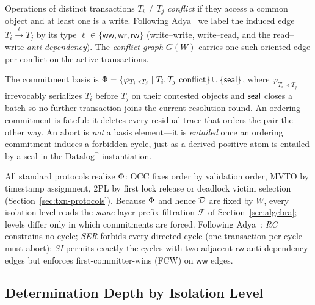 \begin{definition}
  \label{def:txn-conflict}
  Operations of distinct transactions $T_i \neq T_j$ \emph{conflict} if they
  access a common object and at least one is a write. Following
  Adya~\cite{adya1999weak} we label the induced edge
  $T_i \xrightarrow{\ell} T_j$ by its type
  $\ell \in \{\mathsf{ww}, \mathsf{wr}, \mathsf{rw}\}$ (write--write,
  write--read, and the read--write \emph{anti-dependency}). The \emph{conflict
  graph} $G(W)$ carries one such oriented edge per conflict on the active
  transactions.
\end{definition}

\begin{definition}
  \label{def:txn-basis}
  The commitment basis is
  $\Phi = \{\varphi_{T_i \prec T_j} \mid T_i,T_j \text{ conflict}\} \cup
  \{\mathsf{seal}\}$, where $\varphi_{T_i \prec T_j}$ irrevocably serializes $T_i$
  before $T_j$ on their contested objects and $\mathsf{seal}$ closes a batch so no
  further transaction joins the current resolution round. An ordering
  commitment is fateful: it deletes every residual trace that orders the pair
  the other way. An abort is \emph{not} a basis element---it is \emph{entailed}
  once an ordering commitment induces a forbidden cycle, just as a derived
  positive atom is entailed by a seal in the $\mbox{Datalog}^\neg$
  instantiation.
\end{definition}

\noindent
All standard protocols realize $\Phi$: OCC fixes order by validation order,
MVTO by timestamp assignment, 2PL by first lock release or deadlock victim
selection (Section~\ref{sec:txn-protocols}). Because $\Phi$ and hence $\mathcal{D}$
are fixed by $W$, every isolation level reads the \emph{same} layer-prefix
filtration $\mathcal F$ of Section~\ref{sec:algebra}; levels differ only in
which commitments are forced. Following Adya~\cite{adya1999weak}: \emph{RC}
constrains no cycle; \emph{SER} forbids every directed cycle (one transaction
per cycle must abort); \emph{SI} permits exactly the cycles with two adjacent
$\mathsf{rw}$ anti-dependency edges but enforces first-committer-wins (FCW) on
$\mathsf{ww}$ edges.

\subsection{Determination Depth by Isolation Level}
\label{sec:txn-depth-section}

